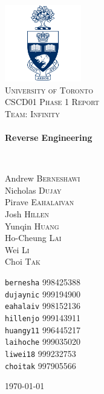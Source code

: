 
\begin{titlepage}
\begin{center}

\includegraphics[width=0.25\textwidth]{img/group/logo.png}~\\[1cm]

\textsc{\LARGE University of Toronto}\\[0.7cm]

\textsc{\Large CSCD01 Phase 1 Report}\\
\textsc{\large Team: Infinity}\\[0.5cm]

\HRule \\[0.4cm]
{ \huge \bfseries Reverse Engineering \\[0.4cm] }

\HRule \\[1.5cm]

\begin{minipage}{0.4\textwidth}
\begin{flushleft} \large
Andrew \textsc{Berneshawi}\\
Nicholas \textsc{Dujay}\\
Pirave \textsc{Eahalaivan}\\
Josh \textsc{Hillen}\\
Yunqin \textsc{Huang}\\
Ho-Cheung \textsc{Lai}\\
Wei \textsc{Li}\\
Choi \textsc{Tak}\\
\end{flushleft}
\end{minipage}
\begin{minipage}{0.4\textwidth}
\begin{flushright} \large
{\tt bernesha} 998425388\\
{\tt dujaynic} 999194900\\
{\tt eahalaiv} 998152136\\
{\tt hillenjo} 999143911\\
{\tt huangy11} 996445217\\
{\tt laihoche} 999035020\\
{\tt liwei18} 999232753\\
{\tt choitak} 997905566\\
\end{flushright}
\end{minipage}

\vfill

{\large \today}
\end{center}
\end{titlepage}